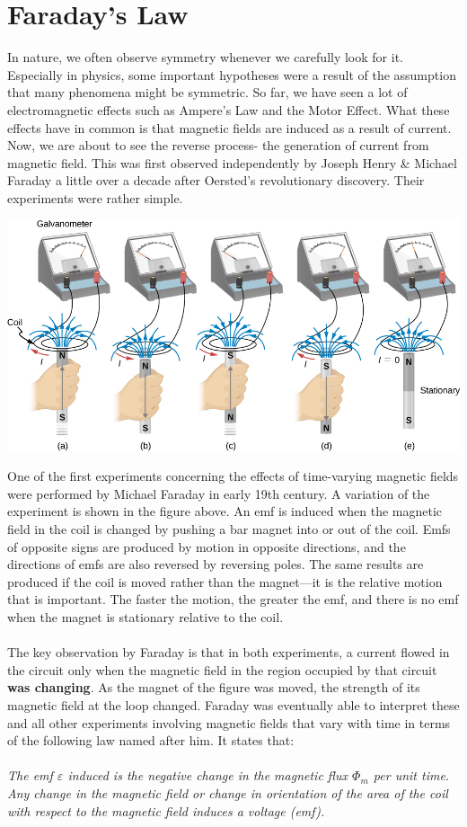 \documentclass[11pt]{article}
\begin{document}
	\section*{Faraday's Law}
	In nature, we often observe symmetry whenever we carefully look for it. Especially in physics, some important hypotheses were a result of the assumption that many phenomena might be symmetric. So far, we have seen a lot of electromagnetic effects such as Ampere's Law and the Motor Effect. What these effects have in common is that magnetic fields are induced as a result of current. Now, we are about to see the reverse process- the generation of current from magnetic field. This was first observed independently by Joseph Henry \& Michael Faraday a little over a decade after Oersted's revolutionary discovery. Their experiments were rather simple.
	\begin{center}
		\includegraphics[scale=0.6]{FaradayExp}
	\end{center}
	One of the first experiments concerning the effects of time-varying magnetic fields were performed by Michael Faraday in early 19th century. A variation of the experiment is shown in the figure above. An emf is induced when the magnetic field in the coil is changed by pushing a bar magnet into or out of the coil. Emfs of opposite signs are produced by motion in opposite directions, and the directions of emfs are also reversed by reversing poles. The same results are produced if the coil is moved rather than the magnet—it is the relative motion that is important. The faster the motion, the greater the emf, and there is no emf when the magnet is stationary relative to the coil. \\ \\
	The key observation by Faraday is that in both experiments, a current flowed in the circuit only when the magnetic field in the region occupied by that circuit \textbf{was changing}. As the magnet of the figure was moved, the strength of its magnetic field at the loop changed. Faraday was eventually able to interpret these and all other experiments involving magnetic fields that vary with time in terms of the following law named after him. It states that: \\ \\
	\textit{The emf $\varepsilon$ induced is the negative change in the magnetic flux  $\Phi_m$ per unit time. Any change in the magnetic field or change in orientation of the area of the coil with respect to the magnetic field induces a voltage (emf).} 
\end{document}
